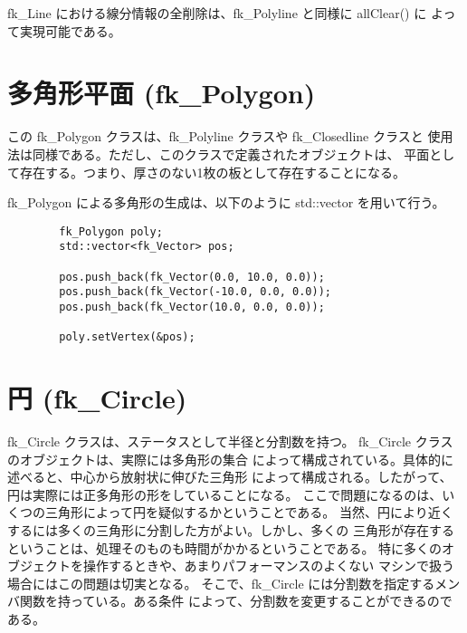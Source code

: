 fk\_Line における線分情報の全削除は、fk\_Polyline と同様に allClear() に
よって実現可能である。
\section{多角形平面 (fk\_Polygon)}
この fk\_Polygon クラスは、fk\_Polyline クラスや fk\_Closedline クラスと
使用法は同様である。ただし、このクラスで定義されたオブジェクトは、
平面として存在する。つまり、厚さのない1枚の板として存在することになる。

fk\_Polygon による多角形の生成は、以下のように std::vector を用いて行う。
\\
\begin{breakbox}
\begin{verbatim}
        fk_Polygon poly;
        std::vector<fk_Vector> pos;

        pos.push_back(fk_Vector(0.0, 10.0, 0.0));
        pos.push_back(fk_Vector(-10.0, 0.0, 0.0));
        pos.push_back(fk_Vector(10.0, 0.0, 0.0));

        poly.setVertex(&pos);
\end{verbatim}
\end{breakbox}

\section{円 (fk\_Circle)}
fk\_Circle クラスは、ステータスとして半径と分割数を持つ。
fk\_Circle クラスのオブジェクトは、実際には多角形の集合
によって構成されている。具体的に述べると、中心から放射状に伸びた三角形
によって構成される。したがって、円は実際には正多角形の形をしていることになる。
ここで問題になるのは、いくつの三角形によって円を疑似するかということである。
当然、円により近くするには多くの三角形に分割した方がよい。しかし、多くの
三角形が存在するということは、処理そのものも時間がかかるということである。
特に多くのオブジェクトを操作するときや、あまりパフォーマンスのよくない
マシンで扱う場合にはこの問題は切実となる。
そこで、fk\_Circle には分割数を指定するメンバ関数を持っている。ある条件
によって、分割数を変更することができるのである。


